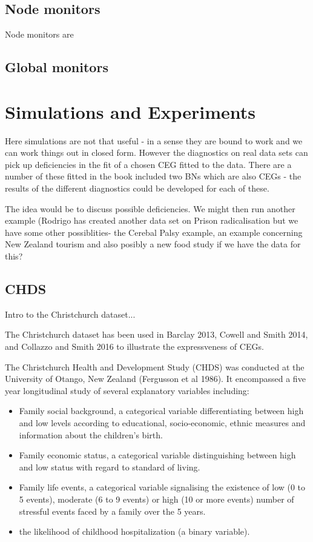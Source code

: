 \documentclass[12pt]{article}
\begin{document}
 

\subsection{Node monitors}
 Node monitors are
\subsection{Global monitors}

\section{Simulations and Experiments}

Here simulations are not that useful - in a sense they are bound to work and
we can work things out in closed form. However the diagnostics on real data
sets can pick up deficiencies in the fit of a chosen CEG fitted to the data.
There are a number of these fitted in the book included two BNs which are
also CEGs - the results of the different diagnostics could be developed for
each of these. 

The idea would be to discuss possible deficiencies. We might
then run another example (Rodrigo has created another data set on Prison
radicalisation but we have some other possiblities- the Cerebal Palsy
example, an example concerning New Zealand tourism and also posibly a new
food study if we have the data for this? 


\subsection{CHDS}

Intro to the Christchurch dataset...

The Christchurch dataset has been used in Barclay 2013, Cowell and Smith 2014, and Collazzo and Smith 2016 to illustrate the expressveness of CEGs. 

The Christchurch Health and Development Study (CHDS) was conducted at the University of Otango, New Zealand (Fergusson et al 1986). It encompassed a five year longitudinal study of several explanatory variables including: 
\begin{itemize}
	\item Family social background, a categorical variable differentiating between high and low levels according to educational, socio-economic, ethnic measures and information about the children’s birth.
	\item Family economic status, a categorical variable distinguishing between high and
	low status with regard to standard of living.
	\item Family life events, a categorical variable signalising the existence of low (0 to 5 events), moderate (6 to 9 events) or high (10 or more events) number of stressful events faced by a family over the 5 years.
	\item the likelihood of childhood hospitalization (a binary variable). 
\end{itemize}
\end{document}
